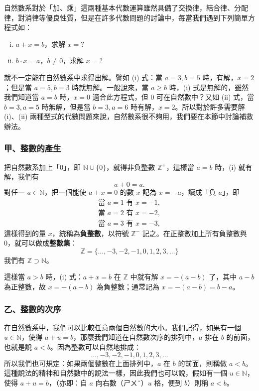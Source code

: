 自然數系對於「加、乘」這兩種基本代數運算雖然具備了交換律，結合律、分配律，對消律等優良性質，但是在許多代數問題的討論中，每當我們遇到下列簡單方程式如：
\begin{enumerate}[(i)]
  \item $a+x=b$，求解 $x=?$
  \item $b \cdot x = a$，$b \neq 0$，求解 $x=?$
\end{enumerate}
就不一定能在自然數系中求得出解。譬如 (i) 式：當 $a=3, b=5$ 時，有解，$x=2$；但是當 $a=5, b=3$ 時就無解。一般說來，當 $a \ge b$ 時，(i) 式是無解的，雖然我們知道當 $a=b$ 時，$x=0$ 適合此方程式，但 0 可在自然數中？又如 (ii) 式，當 $b=3, a=5$ 時無解，但是當 $b=3, a=6$ 時有解，$x=2$。所以對於許多需要解 (i)、(ii) 兩種型式的代數問題來說，自然數系很不夠用，我們要在本節中討論補救辦法。

\subsubsection*{甲、整數的產生}\label{subsec:int_generation}

把自然數系加上「0」，即 $\mathbb{N} \cup \{0\}$，就得非負整數 $\mathbb{Z}^+$，這樣當 $a=b$ 時，(i) 就有解，我們有
\begin{equation*}
  a+0 = a.
\end{equation*}
對任一 $a \in \mathbb{N}$，把一個能使 $a+x=0$ 的數 $x$ 記為 $x = -a$，讀成「負 $a$」，即
\begin{align*}
  \text{當 } a=1 \text{ 有 } x = -1, \\
  \text{當 } a=2 \text{ 有 } x = -2, \\
  \text{當 } a=3 \text{ 有 } x = -3,
\end{align*}
這樣得到的量 $x$，統稱為\textbf{負整數}，以符號 $\mathbb{Z}^-$ 記之。在正整數加上所有負整數與 0，就可以做成\textbf{整數集}：
\begin{equation*}
  \mathbb{Z} = \{\dots, -3, -2, -1, 0, 1, 2, 3, \dots\}
\end{equation*}
我們有 $\mathbb{Z} \supset \mathbb{N}$。

這樣當 $a > b$ 時，(i) 式：$a+x=b$ 在 $\mathbb{Z}$ 中就有解 $x = -(a-b)$ 了，其中 $a-b$ 為正整數，故 $x = -(a-b)$ 為負整數；通常記為 $x = -(a-b) = b-a$。

\subsubsection*{乙、整數的次序}\label{subsec:int_order}

在自然數系中，我們可以比較任意兩個自然數的大小。我們記得，如果有一個 $u \in \mathbb{N}$，使得 $a+u=b$，那麼我們知道在自然數次序的排列中，$a$ 排在 $b$ 的前面，也就是說 $a < b$。因為整數可以自然地排成：
\begin{equation*}
  \dots, -3, -2, -1, 0, 1, 2, 3, \dots
\end{equation*}
所以我們也可規定：如果兩個整數在上面排列中，$a$ 在 $b$ 的前面，則稱做 $a < b$。這種說法的精神和自然數中的說法一樣，因此我們也可以說，假如有一個 $u \in \mathbb{N}$，使得 $a+u=b$，（亦即：自 $a$ 向右數（ㄕㄨˇ）$u$ 格，便到 $b$）則稱 $a < b$。

